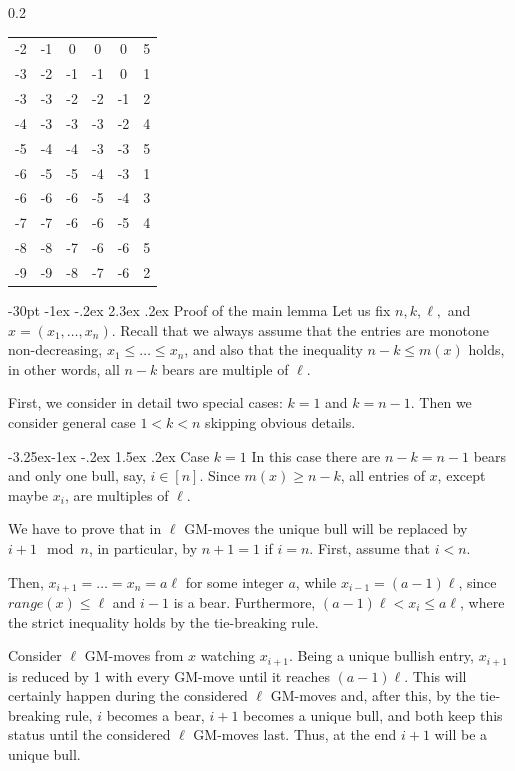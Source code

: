 \documentclass[10pt]{article}
\makeatletter
\renewcommand\section{\@startsection {section}{1}{\z@}
{-30pt \@plus -1ex \@minus -.2ex}
{2.3ex \@plus.2ex}
{\normalfont\normalsize\bfseries\boldmath}}
\renewcommand\subsection{\@startsection{subsection}{2}{\z@}
{-3.25ex\@plus -1ex \@minus -.2ex}
{1.5ex \@plus .2ex}
{\normalfont\normalsize\bfseries\boldmath}}
\theoremstyle{definition}
\makeatother
\begin{document}
\begin{table}[t]
\begin{subtable}{0.2\textwidth}
\begin{tabular*}{\linewidth}[t]{@{\extracolsep{\fill}}ccccc|c}
\hline
-2&  -1&  0&  0&  0&  5\\ 
-3&  -2&  -1&  -1&  0&  1\\ 
-3&  -3&  -2&  -2&  -1& 2\\
\hline
-4&  -3&  -3&  -3&  -2&  4\\
-5&  -4&  -4&  -3&  -3&  5 \\ 
-6&  -5&  -5&  -4&  -3&  1 \\
\hline
-6&  -6&  -6&  -5&  -4& 3\\ 
-7&  -7&  -6&  -6&  -5&  4\\
-8&  -8&  -7&  -6&  -6&  5\\
\hline
-9&  -9&  -8&  -7&  -6& 2\\
\bottomrule
\end{tabular*}
\end{subtable}
\hfill
\end{table}


\section{Proof of the main lemma} 
\label{s-proof-l-main}
Let us fix  $n, k, \ell,$ and $x = (x_1, \ldots, x_n)$. 
Recall that we always assume that the entries are monotone non-decreasing, $x_1 \leq \ldots \leq x_n$, and also that the inequality $n-k \leq m(x)$ holds, in other words,  all  $n-k$  bears are multiple of $\ell$. 

First, we consider in detail two special cases: $k=1$  and  $k = n-1$. 
Then we consider general case $1 < k < n$  skipping obvious details.  

\subsection{Case $k=1$}
In this case there are $n-k = n-1$ bears 
and only one bull, say, $i \in [n]$. 
Since $m(x) \geq n-k$, all entries of $x$, 
except maybe $x_i$, are multiples of $\ell$. 

We have to prove that in $\ell$ GM-moves 
the unique bull will be replaced by $i+1 \mod n$,  
in particular, by $n+1=1$ if $i=n$.
First, assume that $i < n$. 

Then, $x_{i+1} = \ldots = x_n = a \ell$  for some integer  $a$, 
while $x_{i-1} = (a-1) \ell$, since $range(x) \leq \ell$ 
and $i-1$ is a bear. 
Furthermore,  $(a-1) \ell < x_i \leq a \ell$, 
where the strict inequality holds by the tie-breaking rule.

Consider $\ell$ GM-moves from $x$ watching $x_{i+1}$. 
Being a unique bullish entry, 
$x_{i+1}$ is reduced by 1 with every GM-move 
until it reaches $(a-1) \ell$.  
This will certainly happen during the considered $\ell$  
GM-moves and, after this, by the tie-breaking rule, 
$i$  becomes a bear, $i+1$  becomes a unique bull, 
and both keep this status until 
the considered  $\ell$ GM-moves last. 
Thus, at the end  $i+1$  will be a unique bull. 
\end{document}
